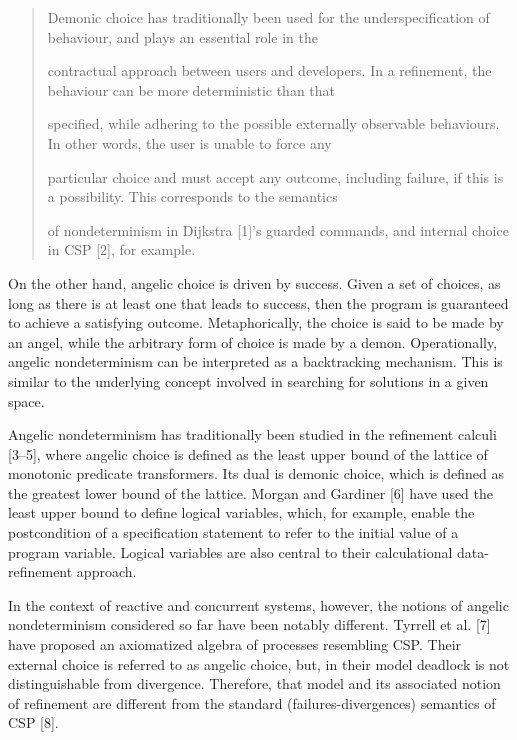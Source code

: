 \documentclass[11pt]{article}
\begin{document}
\begin{quote}\small\raggedright
Demonic choice has traditionally been used for the underspecification of behaviour, and plays an essential role in the
\par
contractual approach between users and developers. In a refinement, the behaviour can be more deterministic than that
\par
specified, while adhering to the possible externally observable behaviours. In other words, the user is unable to force any
\par
particular choice and must accept any outcome, including failure, if this is a possibility. This corresponds to the semantics
\par
of nondeterminism in Dijkstra [1]’s guarded commands, and internal choice in CSP [2], for example.
\end{quote}

On the other hand, angelic choice is driven by success. Given a set of choices, as long as there is at least one that leads to success, then the program is guaranteed to achieve a satisfying outcome. Metaphorically, the choice is said to be made by an angel, while the arbitrary form of choice is made by a demon. Operationally, angelic nondeterminism can be interpreted as a backtracking mechanism. This is similar to the underlying concept involved in searching for solutions in a given space.

Angelic nondeterminism has traditionally been studied in the refinement calculi [3–5], where angelic choice is defined as the least upper bound of the lattice of monotonic predicate transformers. Its dual is demonic choice, which is defined as the greatest lower bound of the lattice. Morgan and Gardiner [6] have used the least upper bound to define logical variables, which, for example, enable the postcondition of a specification statement to refer to the initial value of a program variable. Logical variables are also central to their calculational data-refinement approach.

In the context of reactive and concurrent systems, however, the notions of angelic nondeterminism considered so far have been notably different. Tyrrell et al. [7] have proposed an axiomatized algebra of processes resembling CSP. Their external choice is referred to as angelic choice, but, in their model deadlock is not distinguishable from divergence. Therefore, that model and its associated notion of refinement are different from the standard (failures-divergences) semantics of CSP [8].
\end{document}
